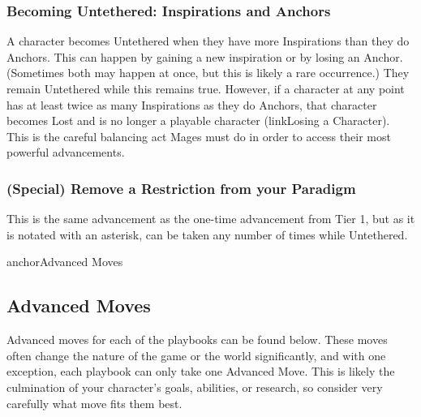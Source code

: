 \documentclass[
  oneside,
  statementpaper,
  9pt]{memoir}
\begin{document}
\hypertarget{becoming-untethered-inspirations-and-anchors}{%
\subsubsection{Becoming Untethered: Inspirations and
Anchors}\label{becoming-untethered-inspirations-and-anchors}}

\begin{Player}

A character becomes Untethered when they have more Inspirations than they do Anchors. This can happen by gaining a new inspiration or by losing an Anchor. (Sometimes both may happen at once, but this is likely a rare occurrence.) They remain Untethered while this remains true. However, if a character at any point has at least twice as many Inspirations as they do Anchors, that character becomes Lost and is no longer a playable character ({{linkLosing a Character}}). This is the careful balancing act Mages must do in order to access their most powerful advancements.

\end{Player}

\hypertarget{special-remove-a-restriction-from-your-paradigm}{%
\subsubsection{(Special) Remove a Restriction from your
Paradigm}\label{special-remove-a-restriction-from-your-paradigm}}

\begin{Player}

This is the same advancement as the one-time advancement from Tier 1, but as it is notated with an asterisk, can be taken any number of times while Untethered.

{{anchorAdvanced Moves}}

\end{Player}

\hypertarget{advanced-moves-1}{%
\subsection{Advanced Moves}\label{advanced-moves-1}}

\begin{Player}

Advanced moves for each of the playbooks can be found below. These moves often change the nature of the game or the world significantly, and with one exception, each playbook can only take one Advanced Move. This is likely the culmination of your character’s goals, abilities, or research, so consider very carefully what move fits them best.

\end{Player}
\end{document}
